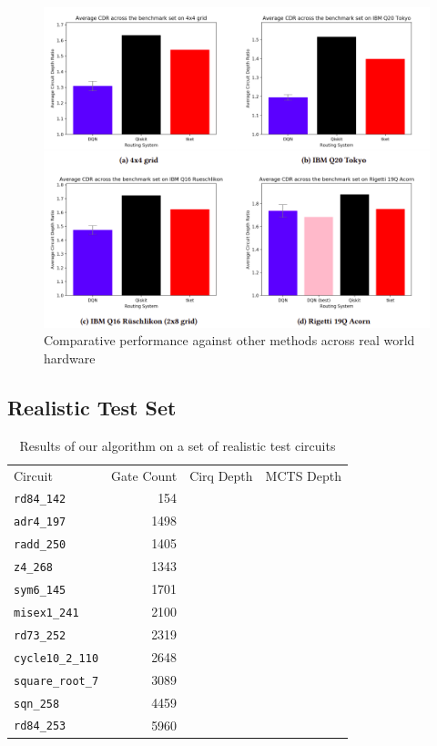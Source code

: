 \documentclass[%
 reprint,
 amsmath,amssymb,
 aps,
]{revtex4-2}
\begin{document}
\begin{figure}[H]
    \includegraphics[width=\linewidth]{images/results-hardwares.png}
    \caption{\label{fig:results-hardware}
        Comparative performance against other methods across real world hardware}
\end{figure}


\subsection{\label{sec:results-realistic}Realistic Test Set}

\begin{table}[H]
    \caption{\label{tab:small-circuits}%
        Results of our algorithm on a set of realistic test circuits
    }
    \begin{ruledtabular}
        \begin{tabular}{lrrr}
            \textrm{Circuit}        &
            \textrm{Gate Count}     &
            \textrm{Cirq Depth}     &
            \textrm{MCTS Depth}                 \\
            \colrule

            \verb+rd84_142+  & 154  &  & \\
            \verb+adr4_197+  & 1498 &  & \\
            \verb+radd_250+  & 1405 &  & \\
            \verb+z4_268+  & 1343 &  & \\
            \verb+sym6_145+  & 1701 &  & \\
            \verb+misex1_241+  & 2100 &  & \\
            \verb+rd73_252+  & 2319 &  & \\
            \verb+cycle10_2_110+  & 2648 &  & \\
            \verb+square_root_7+  & 3089 &  & \\
            \verb+sqn_258+ & 4459 &  & \\
            \verb+rd84_253+ & 5960 &  & \\
        \end{tabular}
    \end{ruledtabular}
\end{table}
\end{document}
